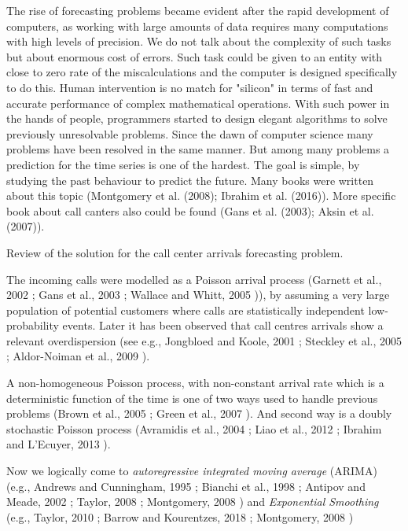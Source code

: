 \documentclass[12pt,a4paper]{article}
\theoremstyle{myplain}
\numberwithin{equation}{section}
\begin{document}
The rise of forecasting problems became evident after the rapid development of computers, as working with large amounts of data requires many computations with high levels of precision. We do not talk about the complexity of such tasks but about enormous cost of errors. Such task could be given to an entity with close to zero rate of the miscalculations and the computer is designed specifically to do this. Human intervention is no match for "silicon" in terms of fast and accurate performance of complex mathematical operations. With such power in the hands of people, programmers  started to design elegant algorithms to solve previously unresolvable problems. Since the dawn of computer science many problems have been resolved in the same manner. But among many problems a prediction for the time series is one of the hardest. The goal is simple, by studying the past behaviour to predict the future. Many books were written about this topic (Montgomery et al. (2008)\cite{MainBook}; Ibrahim et al. (2016)\cite{Ibrahim_2016}). More specific book about call canters also could be found (Gans et al. (2003)\cite{Gans_2003}; Aksin et al. (2007)\cite{Aksin_2007}).

Review of the solution for the call center arrivals forecasting problem.

The incoming calls were modelled as a Poisson arrival process (Garnett et al., 2002 \cite{Garnett_2002}; Gans et al., 2003 \cite{Gans_2003}; Wallace and Whitt, 2005 \cite{Wallace_and_Whitt_2005})), by assuming a very large population of potential customers where calls are statistically independent low-probability events. Later it has been observed that call centres arrivals show a relevant overdispersion (see e.g., Jongbloed and Koole, 2001 \cite{Jongbloed_and_Koole_2001}; Steckley et al., 2005 \cite{Steckley_2005}; Aldor-Noiman et al., 2009 \cite{Aldor-Noiman_2009}).

A non-homogeneous Poisson process, with non-constant arrival rate which is a deterministic function of the time is one of two ways used to handle previous problems (Brown et al., 2005 \cite{Brown_2005}; Green et al., 2007 \cite{Green_2007}). And second way is a doubly stochastic Poisson process (Avramidis et al., 2004 \cite{Avramidis_2004}; Liao et al., 2012 \cite{Liao_2012}; Ibrahim and L'Ecuyer, 2013 \cite{Ibrahim_and_LEcuyer_2013}).

Now we logically come to \textit{autoregressive integrated moving average} (ARIMA) (e.g., Andrews and Cunningham, 1995 \cite{Andrews_and_Cunningham_1995}; Bianchi et al., 1998 \cite{Bianchi_1998}; Antipov and Meade, 2002 \cite{Antipov_and_Meade_2002}; Taylor, 2008 \cite{Taylor_2008}; Montgomery, 2008 \cite{MainBook}) and \textit{Exponential Smoothing} (e.g., Taylor, 2010 \cite{Taylor_2010}; Barrow and Kourentzes, 2018 \cite{SidePaperSN}; Montgomery, 2008 \cite{MainBook})
\end{document}
